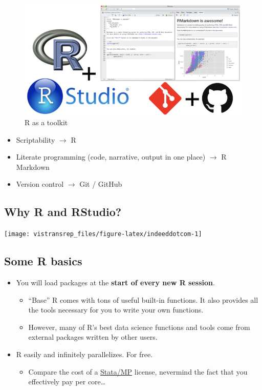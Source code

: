 \documentclass[]{book}
\providecommand{\tightlist}{%
  \setlength{\itemsep}{0pt}\setlength{\parskip}{0pt}}
\begin{document}
\begin{figure}
\centering
\includegraphics{img/toolkit.png}
\caption{R as a toolkit}
\end{figure}

\begin{itemize}
\tightlist
\item
  Scriptability \(\rightarrow\) R
\item
  Literate programming (code, narrative, output in one place) \(\rightarrow\) R Markdown
\item
  Version control \(\rightarrow\) Git / GitHub
\end{itemize}

\hypertarget{why-r-and-rstudio}{%
\subsection{Why R and RStudio?}\label{why-r-and-rstudio}}

\begin{flushright}\texttt{[image: vistransrep\_files/figure-latex/indeeddotcom-1]} \end{flushright}

\hypertarget{some-r-basics}{%
\subsection{Some R basics}\label{some-r-basics}}

\begin{itemize}
\tightlist
\item
  You will load packages at the \textbf{start of every new R session}.

  \begin{itemize}
  \tightlist
  \item
    ``Base'' R comes with tons of useful built-in functions. It also provides all the tools necessary for you to write your own functions.
  \item
    However, many of R's best data science functions and tools come from external packages written by other users.
  \end{itemize}
\item
  R easily and infinitely parallelizes. For free.

  \begin{itemize}
  \tightlist
  \item
    Compare the cost of a \href{https://www.stata.com/statamp/}{Stata/MP} license, nevermind the fact that you effectively pay per core\ldots{}
  \end{itemize}
\end{itemize}
\end{document}
